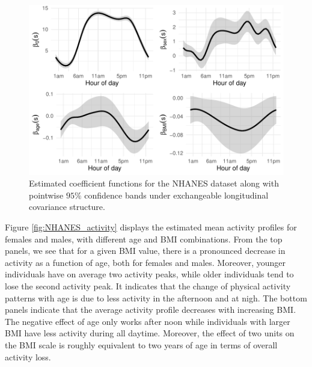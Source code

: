 \documentclass[submit]{smj}
\begin{document}
\begin{figure}[!h]
	\centering
	\includegraphics[width=\linewidth]{NHANES_exch48_cp.pdf}
	\caption{ Estimated coefficient functions for the NHANES dataset along with pointwise $95\%$ confidence bands under exchangeable longitudinal covariance structure.} 
	\label{fig:NHANES_beta}
\end{figure}


Figure \ref{fig:NHANES_activity} displays the estimated mean activity profiles for females and males, with different age and BMI combinations. From the top panels, we see that for a given BMI value, there is a pronounced decrease in activity as a function of age, both for females and males. Moreover, younger individuals have on average two activity peaks, while older individuals tend to lose the second activity peak. It indicates that the change of physical activity patterns with age is due to less activity in the afternoon and at nigh. The bottom panels indicate that the average activity profile decreases with increasing BMI. The negative effect of age only works after noon while individuals with larger BMI have less activity during all daytime. Moreover, the effect of two units on the BMI scale is roughly equivalent to two years of age in terms of overall activity loss. 
\end{document}
